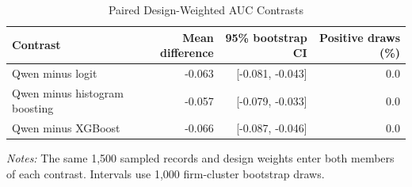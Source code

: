 \begin{table}[!htbp]\centering
\caption{Paired Design-Weighted AUC Contrasts}\label{tab:a_auc_diff}
\begin{tabular}{lrrr}\toprule
Contrast & Mean difference & 95\% bootstrap CI & Positive draws (\%) \\
\midrule
Qwen minus logit & -0.063 & [-0.081, -0.043] & 0.0 \\
Qwen minus histogram boosting & -0.057 & [-0.079, -0.033] & 0.0 \\
Qwen minus XGBoost & -0.066 & [-0.087, -0.046] & 0.0 \\
\bottomrule\end{tabular}
\begin{minipage}{0.92\textwidth}\footnotesize\textit{Notes:} The same 1,500 sampled records and design weights enter both members of each contrast. Intervals use 1,000 firm-cluster bootstrap draws.\end{minipage}
\end{table}
